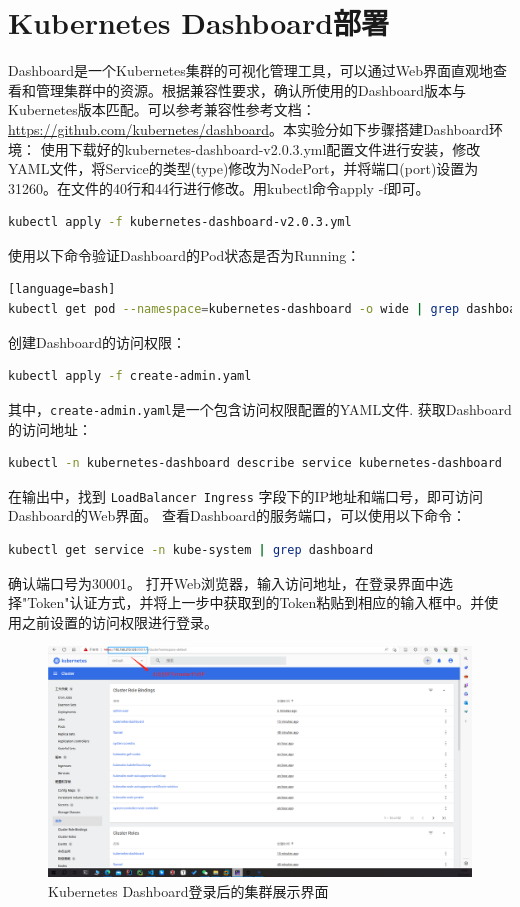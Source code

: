 \section{Kubernetes Dashboard部署}
Dashboard是一个Kubernetes集群的可视化管理工具，可以通过Web界面直观地查看和管理集群中的资源。根据兼容性要求，确认所使用的Dashboard版本与Kubernetes版本匹配。可以参考兼容性参考文档：\url{https://github.com/kubernetes/dashboard}。本实验分如下步骤搭建Dashboard环境：
使用下载好的kubernetes-dashboard-v2.0.3.yml配置文件进行安装，修改YAML文件，将Service的类型(type)修改为NodePort，并将端口(port)设置为31260。在文件的40行和44行进行修改。用kubectl命令apply -f即可。
\begin{lstlisting}[language=bash]
kubectl apply -f kubernetes-dashboard-v2.0.3.yml
\end{lstlisting}
使用以下命令验证Dashboard的Pod状态是否为Running：
\begin{lstlisting}[language=bash][language=bash]
kubectl get pod --namespace=kubernetes-dashboard -o wide | grep dashboard
\end{lstlisting}
创建Dashboard的访问权限：
\begin{lstlisting}[language=bash]
kubectl apply -f create-admin.yaml
\end{lstlisting}
其中，\texttt{create-admin.yaml}是一个包含访问权限配置的YAML文件.
获取Dashboard的访问地址：
\begin{lstlisting}[language=bash]
kubectl -n kubernetes-dashboard describe service kubernetes-dashboard
\end{lstlisting}
在输出中，找到 \texttt{LoadBalancer Ingress} 字段下的IP地址和端口号，即可访问Dashboard的Web界面。
查看Dashboard的服务端口，可以使用以下命令：
\begin{lstlisting}[language=bash]
kubectl get service -n kube-system | grep dashboard
\end{lstlisting}
确认端口号为30001。
打开Web浏览器，输入访问地址，在登录界面中选择"Token"认证方式，并将上一步中获取到的Token粘贴到相应的输入框中。并使用之前设置的访问权限进行登录。
\begin{figure}[htb]
\centering
\includegraphics[width=1.0\textwidth]{figures/chapter2/dashboard.png}
\caption{Kubernetes Dashboard登录后的集群展示界面}
\label{fig2:Kubernetes Dashboard登录后的集群展示界面}
\end{figure}

